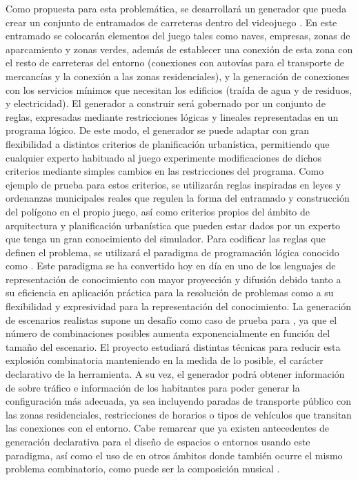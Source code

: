 Como propuesta para esta problemática, se desarrollará un generador que pueda crear un conjunto de entramados de carreteras dentro del videojuego \cities. En este entramado se colocarán elementos del juego tales como naves, empresas, zonas de aparcamiento y zonas verdes, además de establecer una conexión de esta zona con el resto de carreteras del entorno (conexiones con autovías para el transporte de mercancías y la conexión a las zonas residenciales), y la generación de conexiones con los servicios mínimos que necesitan los edificios (traída de agua y de residuos, y electricidad). El generador a construir será gobernado por un conjunto de reglas, expresadas mediante restricciones lógicas y lineales representadas en un programa lógico. De este modo, el generador se puede adaptar con gran flexibilidad a distintos criterios de planificación urbanística, permitiendo que cualquier experto habituado al juego experimente modificaciones de dichos criterios mediante simples cambios en las restricciones del programa. Como ejemplo de prueba para estos criterios, se utilizarán reglas inspiradas en leyes y ordenanzas municipales reales \cite{guia_galicia} que regulen la forma del entramado y construcción del polígono en el propio juego, así como criterios propios del ámbito de arquitectura y planificación urbanística que pueden estar dados por un experto que tenga un gran conocimiento del simulador. Para codificar las reglas que definen el problema, se utilizará el paradigma de programación lógica conocido como \asp \cite{asp}. Este paradigma se ha convertido hoy en día en uno de los lenguajes de representación de conocimiento con mayor proyección y difusión debido tanto a su eficiencia en aplicación práctica para la resolución de problemas como a su flexibilidad y expresividad para la representación del conocimiento. La generación de escenarios realistas \cite{5783900} supone un desafío como caso de prueba para \asp, ya que el número de combinaciones posibles aumenta exponencialmente en función del tamaño del escenario. El proyecto estudiará distintas técnicas para reducir esta explosión combinatoria manteniendo en la medida de lo posible, el carácter declarativo de la herramienta. A su vez, el generador podrá obtener información de \cities sobre tráfico e información de los habitantes para poder generar la configuración más adecuada, ya sea incluyendo paradas de transporte público con las zonas residenciales, restricciones de horarios o tipos de vehículos que transitan las conexiones con el entorno. Cabe remarcar que ya existen antecedentes de generación declarativa para el diseño de espacios o entornos \cite{freeciv-editor} \cite{desing} usando este paradigma, así como el uso de \asp en otros ámbitos donde también ocurre el mismo problema combinatorio, como puede ser la composición musical \cite{haspie}\cite{DBLP:journals/corr/abs-1006-4948}.

